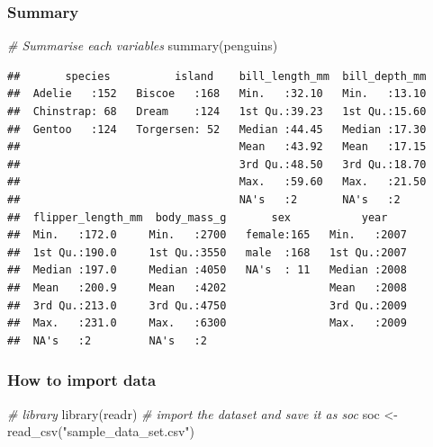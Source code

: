 \documentclass[
]{article}
\newenvironment{Shaded}{\begin{snugshade}}{\end{snugshade}}
\newcommand{\CommentTok}[1]{\textcolor[rgb]{0.56,0.35,0.01}{\textit{#1}}}
\newcommand{\FunctionTok}[1]{\textcolor[rgb]{0.00,0.00,0.00}{#1}}
\newcommand{\NormalTok}[1]{#1}
\newcommand{\OtherTok}[1]{\textcolor[rgb]{0.56,0.35,0.01}{#1}}
\newcommand{\StringTok}[1]{\textcolor[rgb]{0.31,0.60,0.02}{#1}}
\begin{document}
\hypertarget{summary}{%
\subsubsection{Summary}\label{summary}}

\begin{Shaded}
\begin{Highlighting}[]
\CommentTok{\# Summarise each variables}
\FunctionTok{summary}\NormalTok{(penguins)}
\end{Highlighting}
\end{Shaded}

\begin{verbatim}
##       species          island    bill_length_mm  bill_depth_mm  
##  Adelie   :152   Biscoe   :168   Min.   :32.10   Min.   :13.10  
##  Chinstrap: 68   Dream    :124   1st Qu.:39.23   1st Qu.:15.60  
##  Gentoo   :124   Torgersen: 52   Median :44.45   Median :17.30  
##                                  Mean   :43.92   Mean   :17.15  
##                                  3rd Qu.:48.50   3rd Qu.:18.70  
##                                  Max.   :59.60   Max.   :21.50  
##                                  NA's   :2       NA's   :2      
##  flipper_length_mm  body_mass_g       sex           year     
##  Min.   :172.0     Min.   :2700   female:165   Min.   :2007  
##  1st Qu.:190.0     1st Qu.:3550   male  :168   1st Qu.:2007  
##  Median :197.0     Median :4050   NA's  : 11   Median :2008  
##  Mean   :200.9     Mean   :4202                Mean   :2008  
##  3rd Qu.:213.0     3rd Qu.:4750                3rd Qu.:2009  
##  Max.   :231.0     Max.   :6300                Max.   :2009  
##  NA's   :2         NA's   :2
\end{verbatim}

\hypertarget{how-to-import-data}{%
\subsubsection{How to import data}\label{how-to-import-data}}

\begin{Shaded}
\begin{Highlighting}[]
\CommentTok{\# library}
\FunctionTok{library}\NormalTok{(readr)}
\CommentTok{\# import the dataset and save it as soc}
\NormalTok{soc }\OtherTok{\textless{}{-}} \FunctionTok{read\_csv}\NormalTok{(}\StringTok{"sample\_data\_set.csv"}\NormalTok{)}
\end{Highlighting}
\end{Shaded}
\end{document}
